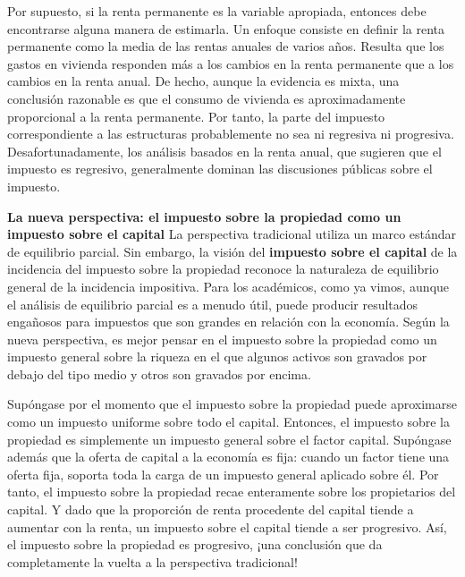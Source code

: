 \documentclass[10pt,a4paper]{article}
\begin{document}
Por supuesto, si la renta permanente es la variable apropiada, entonces debe encontrarse alguna manera de estimarla. Un enfoque consiste en definir la renta permanente como la media de las rentas anuales de varios años. Resulta que los gastos en vivienda responden más a los cambios en la renta permanente que a los cambios en la renta anual. De hecho, aunque la evidencia es mixta, una conclusión razonable es que el consumo de vivienda es aproximadamente proporcional a la renta permanente. Por tanto, la parte del impuesto correspondiente a las estructuras probablemente no sea ni regresiva ni progresiva. Desafortunadamente, los análisis basados en la renta anual, que sugieren que el impuesto es regresivo, generalmente dominan las discusiones públicas sobre el impuesto.

\textbf{La nueva perspectiva: el impuesto sobre la propiedad como un impuesto sobre el capital} 
La perspectiva tradicional utiliza un marco estándar de equilibrio parcial. Sin embargo, la visión del \textbf{impuesto sobre el capital} de la incidencia del impuesto sobre la propiedad reconoce la naturaleza de equilibrio general de la incidencia impositiva. Para los académicos, como ya vimos, aunque el análisis de equilibrio parcial es a menudo útil, puede producir resultados engañosos para impuestos que son grandes en relación con la economía. Según la nueva perspectiva, es mejor pensar en el impuesto sobre la propiedad como un impuesto general sobre la riqueza en el que algunos activos son gravados por debajo del tipo medio y otros son gravados por encima. 

Supóngase por el momento que el impuesto sobre la propiedad puede aproximarse como un impuesto uniforme sobre todo el capital. Entonces, el impuesto sobre la propiedad es simplemente un impuesto general sobre el factor capital. Supóngase además que la oferta de capital a la economía es fija: cuando un factor tiene una oferta fija, soporta toda la carga de un impuesto general aplicado sobre él. Por tanto, el impuesto sobre la propiedad recae enteramente sobre los propietarios del capital. Y dado que la proporción de renta procedente del capital tiende a aumentar con la renta, un impuesto sobre el capital tiende a ser progresivo. Así, el impuesto sobre la propiedad es progresivo, ¡una conclusión que da completamente la vuelta a la perspectiva tradicional!
\end{document}
